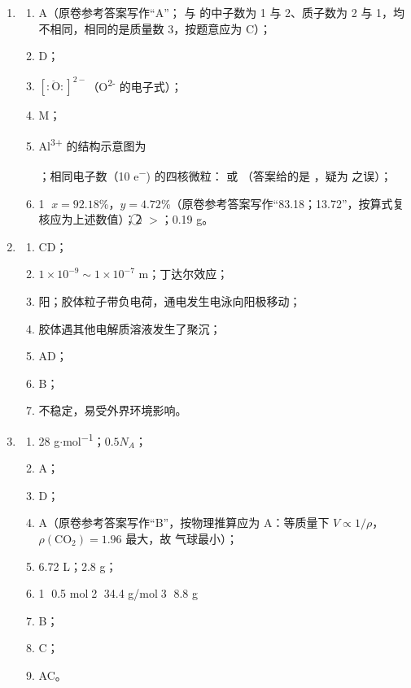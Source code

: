\documentclass[11pt,a4paper]{article}
\begin{document}
\begin{enumerate}[label=\textbf{\arabic*.},leftmargin=2.5em]
\item
\begin{enumerate}[label=（\arabic*）]
\item A（原卷参考答案写作“A”； 与  的中子数为 1 与 2、质子数为 2 与 1，均不相同，相同的是质量数 3，按题意应为 C）；
\item D；
\item $\left[:\ddot{\mathrm{O}}:\right]^{2-}$（O\textsuperscript{2-} 的电子式）；
\item M；
\item Al\textsuperscript{3+} 的结构示意图为
；相同电子数（10 e\textsuperscript{$-$}) 的四核微粒： 或 （答案给的是 ，疑为  之误）；
\item \textcircled{1} $x = 92.18$\%，$y = 4.72$\%（原卷参考答案写作“83.18；13.72”，按算式复核应为上述数值）；\textcircled{2} $>$；0.19 g。
\end{enumerate}

\item
\begin{enumerate}[label=（\arabic*）]
\item CD；
\item $1\times 10^{-9} \sim 1\times 10^{-7}$ m；丁达尔效应；
\item 阳；胶体粒子带负电荷，通电发生电泳向阳极移动；
\item 胶体遇其他电解质溶液发生了聚沉；
\item AD；
\item B；
\item 不稳定，易受外界环境影响。
\end{enumerate}

\item
\begin{enumerate}[label=（\arabic*）]
\item 28 g$\cdot$mol\textsuperscript{$-$1}；$0.5N_A$；
\item A；
\item D；
\item A（原卷参考答案写作“B”，按物理推算应为 A：等质量下 $V\propto 1/\rho$，$\rho(\mathrm{CO_2})=1.96$ 最大，故  气球最小）；
\item 6.72 L；2.8 g；
\item \textcircled{1} 0.5 mol；\textcircled{2} 34.4 g/mol；\textcircled{3} 8.8 g；
\item B；
\item C；
\item AC。
\end{enumerate}


\end{enumerate}
\end{document}
